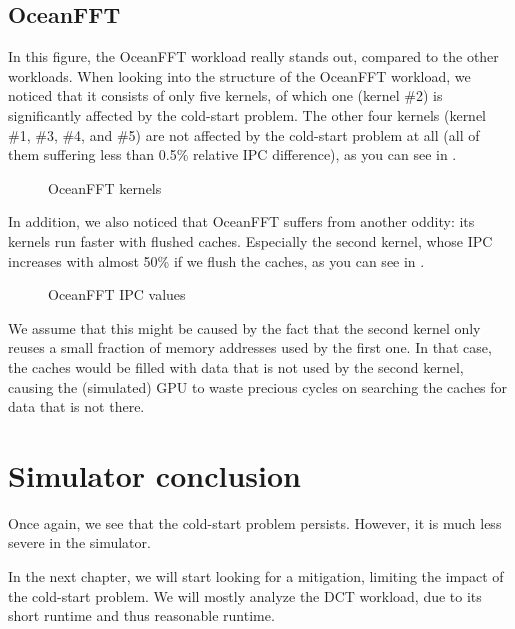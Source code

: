 \subsection{OceanFFT}\label{subsec:oceanfft}
In this figure, the OceanFFT workload really stands out, compared to the other workloads.
When looking into the structure of the OceanFFT workload, we noticed that it consists of only five kernels, of which one (kernel \#2) is significantly affected by the cold-start problem.
The other four kernels (kernel \#1, \#3, \#4, and \#5) are not affected by the cold-start problem at all (all of them suffering less than 0.5\% relative IPC difference), as you can see in .

\begin{figure}[ht]
    \centering
    \caption{OceanFFT kernels}
    \label{fig:ocean_kernels}
\end{figure}

In addition, we also noticed that OceanFFT suffers from another oddity: its kernels run faster with flushed caches.
Especially the second kernel, whose IPC increases with almost 50\% if we flush the caches, as you can see in .

\begin{figure}[ht]
    \centering
    \caption{OceanFFT IPC values}
    \label{fig:ocean_issue}
\end{figure}

We assume that this might be caused by the fact that the second kernel only reuses a small fraction of memory addresses used by the first one.
In that case, the caches would be filled with data that is not used by the second kernel, causing the (simulated) GPU to waste precious cycles on searching the caches for data that is not there.

\FloatBarrier
\section{Simulator conclusion}\label{sec:simulator-conclusion}
Once again, we see that the cold-start problem persists.
However, it is much less severe in the simulator.

In the next chapter, we will start looking for a mitigation, limiting the impact of the cold-start problem.
We will mostly analyze the DCT workload, due to its short runtime and thus reasonable runtime.
